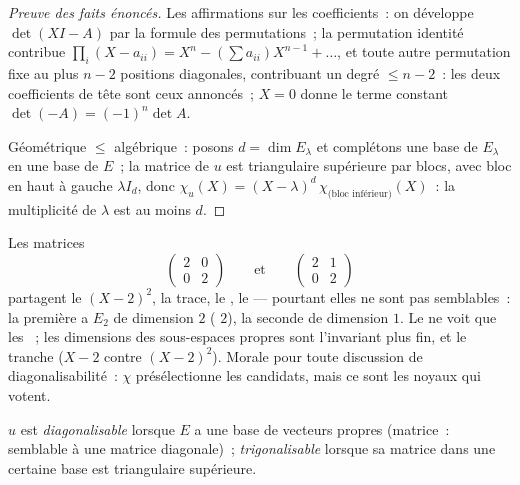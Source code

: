 \begin{proof}[Preuve des faits énoncés]
Les affirmations sur les coefficients~: on développe $\det(XI - A)$
par la formule des permutations~; la permutation identité contribue
$\prod_i (X - a_{ii}) = X^n - (\sum a_{ii})X^{n-1} + \dots$, et toute
autre permutation fixe au plus $n - 2$ positions diagonales,
contribuant un degré $\leq n - 2$~: les deux coefficients de tête
sont ceux annoncés~; $X = 0$ donne le terme constant $\det(-A) =
(-1)^n\det A$.

Géométrique $\leq$ algébrique~: posons $d = \dim E_\lambda$ et
complétons une base de $E_\lambda$ en une base de $E$~; la matrice de
$u$ est triangulaire supérieure par blocs, avec bloc en haut à gauche
$\lambda I_d$, donc $\chi_u(X) = (X - \lambda)^d\, \chi_{\text{(bloc
inférieur)}}(X)$~: la multiplicité de $\lambda$ est au moins $d$.
\end{proof}

\begin{example}\label{ex:b2:reduction:samechi}
Les matrices
\[
\begin{pmatrix}2 & 0\\ 0 & 2\end{pmatrix}
\qquad\text{et}\qquad
\begin{pmatrix}2 & 1\\ 0 & 2\end{pmatrix}
\]
partagent le  $(X - 2)^2$, la trace, le
, le  --- pourtant elles ne sont pas semblables~:
la première a $E_2$ de dimension $2$ ( $2$),
la seconde de dimension $1$. Le  ne voit que
les ~; les dimensions des sous-espaces
propres sont l'invariant plus fin, et le  tranche
($X - 2$ contre $(X - 2)^2$). Morale pour toute discussion de
diagonalisabilité~: $\chi$ présélectionne les candidats, mais ce sont
les noyaux qui votent.
\end{example}

\begin{definition}\label{def:b2:reduction:diag}
$u$ est \emph{diagonalisable} lorsque $E$ a une
base de vecteurs propres (matrice~: semblable à une matrice
diagonale)~; \emph{trigonalisable} lorsque sa
matrice dans une certaine base est triangulaire supérieure.
\end{definition}

